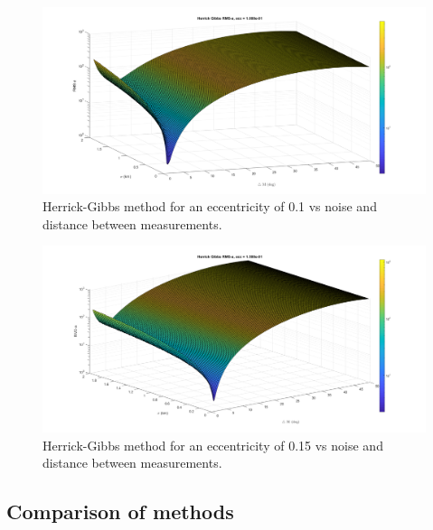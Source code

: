\documentclass[12pt]{article}
\begin{document}
	\begin{figure}[H]
		\centering
		\includegraphics[width=0.7\linewidth]{herrickgibbs_e_1}
		\caption{Herrick-Gibbs method for an eccentricity of 0.1 vs noise and distance between measurements.}
		\label{fig:herrickgibbse1}
	\end{figure}
	
	\begin{figure}[H]
		\centering
		\includegraphics[width=0.7\linewidth]{herrickgibbs_e_15}
		\caption{Herrick-Gibbs method for an eccentricity of 0.15 vs noise and distance between measurements.}
		\label{fig:herrickgibbse15}
	\end{figure}
\newpage
	\subsection{Comparison of methods}
	
\end{document}

